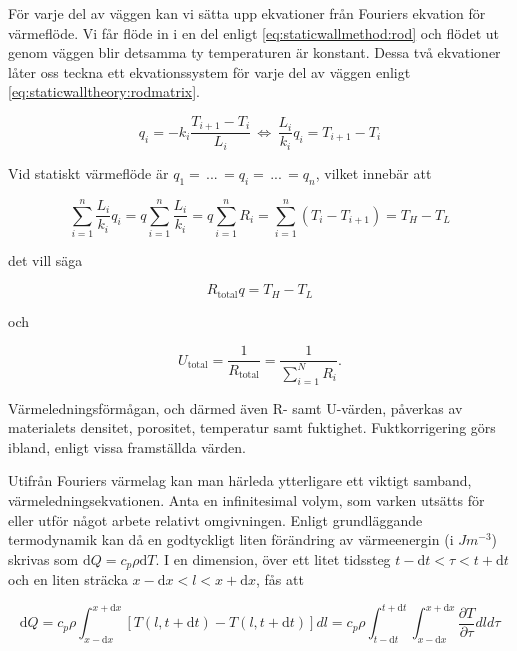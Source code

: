 För varje del av väggen kan vi sätta upp ekvationer från Fouriers ekvation för värmeflöde. Vi får flöde in i en del enligt \eqref{eq:staticwallmethod:rod} och flödet ut genom väggen blir detsamma ty temperaturen är konstant. Dessa två ekvationer låter oss teckna ett ekvationssystem för varje del av väggen enligt \eqref{eq:staticwalltheory:rodmatrix}. \cite{lewis04}

\begin{equation}
\label{eq:staticwallmethod:rod}
q_i = -k_i\frac{T_{i+1}-T_{i}}{L_i} \, \Leftrightarrow \, \frac{L_i}{k_i}q_i = T_{i+1}-T_{i}
\end{equation}

Vid statiskt värmeflöde är $q_1 = \, ... \, = q_i = \, ... \, = q_n$, vilket innebär att

\begin{equation}
\sum_{i=1}^n \frac{L_i}{k_i}q_i = q\sum_{i=1}^n \frac{L_i}{k_i} = q\sum_{i=1}^n R_i = \sum_{i=1}^n \left( T_{i}-T_{i+1} \right) = T_H - T_L 
\end{equation}

det vill säga

\begin{equation}
R_\text{total}q = T_H - T_L
\end{equation}

och

\begin{equation}
U_\text{total} = \frac{1}{R_\text{total}} = \frac{1}{\sum_{i=1}^N R_i}.
\end{equation}

Värmeledningsförmågan, och därmed även R- samt U-värden, påverkas av materialets densitet, porositet, temperatur samt fuktighet. Fuktkorrigering görs ibland, enligt vissa framställda värden.

Utifrån Fouriers värmelag kan man härleda ytterligare ett viktigt samband, värmeledningsekvationen. Anta en infinitesimal volym, som varken utsätts för eller utför något arbete relativt omgivningen. Enligt grundläggande termodynamik kan då en godtyckligt liten förändring av värmeenergin (i $\unit{}{J m^{-3}}$) skrivas som $\mathrm{d}Q = c_p \rho \mathrm{d}T$.  I en dimension, över ett litet tidssteg $t-\mathrm{d}t< \tau < t+\mathrm{d}t$ och en liten sträcka $x-\mathrm{d}x < l < x+\mathrm{d}x$, fås att

\begin{equation}
\mathrm{d}Q = c_p \rho \int_{x-\mathrm{d}x}^{x+\mathrm{d}x} \left[ T\left( l, t+\mathrm{d}t\right) - T\left( l, t+\mathrm{d}t\right)\right]dl = c_p \rho \int_{t-\mathrm{d}t}^{t+\mathrm{d}t} \int_{x-\mathrm{d}x}^{x+\mathrm{d}x} \frac{\partial T}{\partial \tau} dld\tau
\end{equation}

